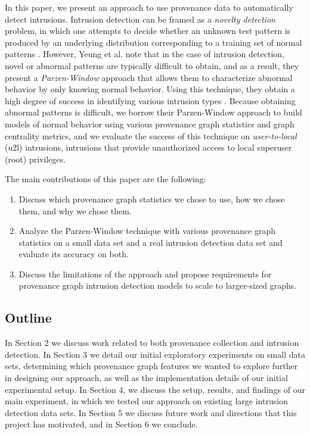 \documentclass[10pt,twocolumn]{article}
\begin{document}
In this paper, we present an approach to use provenance data to automatically detect intrusions. Intrusion
detection can be framed as a {\em novelty detection} problem, in which one attempts to decide whether
an unknown test pattern is produced by an underlying distribution corresponding to a training set
of normal patterns \cite{parzen}. However, Yeung et al. note that in the case of intrusion detection, novel
or abnormal patterns are typically difficult to obtain, and as a result, they present a {\em Parzen-Window} approach that allows them to characterize abnormal behavior by only knowing normal behavior.
Using this technique, they obtain a high degree of success
in identifying various intrusion types \cite{parzen}. Because obtaining abnormal patterns is difficult, 
we borrow their Parzen-Window approach to build models of normal behavior using 
various provenance graph statistics and graph centrality metrics, and we evaluate the success of this technique
on {\em user-to-local} (u2l) intrusions, intrusions that provide unauthorized access to local superuser (root) privileges.

The main contributions of this paper are the following:
\begin{enumerate}
\item Discuss which provenance graph statistics we chose to use, how we chose them, and why we chose them.
\item Analyze the Parzen-Window technique with various provenance graph statistics on a small data set and a real intrusion detection data set and evaluate its accuracy on both.
\item Discuss the limitations of the approach and propose requirements for provenance graph intrusion detection models to scale to larger-sized graphs.
\end{enumerate}

\subsection{Outline}
In Section 2 we discuss work related to both provenance collection and intrusion detection. In Section 3 we detail our initial exploratory experiments on small data sets, determining which provenance graph features we wanted to explore further in designing our approach, as well as the implementation details of our initial experimental setup. In Section 4, we discuss the setup, results, and findings of our main experiment, in which we tested our approach on existing large intrusion detection data sets. In Section 5 we discuss future work and directions that this project has motivated, and in Section 6 we conclude.
\end{document}
